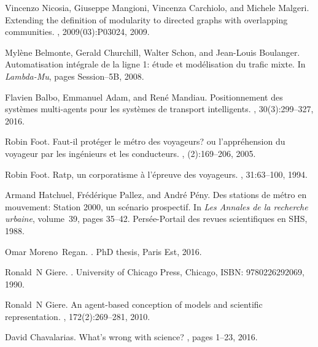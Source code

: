 \documentclass[runningheads,a4paper]{llncs2e/llncs}
\begin{document}
\begin{thebibliography}{10}
Vincenzo Nicosia, Giuseppe Mangioni, Vincenza Carchiolo, and Michele Malgeri.
\newblock Extending the definition of modularity to directed graphs with
  overlapping communities.
,
  2009(03):P03024, 2009.

Myl{\`e}ne Belmonte, Gerald Churchill, Walter Schon, and Jean-Louis Boulanger.
\newblock Automatisation int{\'e}grale de la ligne 1: {\'e}tude et
  mod{\'e}lisation du trafic mixte.
\newblock In {\em Lambda-Mu}, pages Session--5B, 2008.

Flavien Balbo, Emmanuel Adam, and Ren{\'e} Mandiau.
\newblock Positionnement des syst{\`e}mes multi-agents pour les syst{\`e}mes de
  transport intelligents.
, 30(3):299--327, 2016.

Robin Foot.
\newblock Faut-il prot{\'e}ger le m{\'e}tro des voyageurs? ou
  l'appr{\'e}hension du voyageur par les ing{\'e}nieurs et les conducteurs.
, (2):169--206, 2005.

Robin Foot.
\newblock Ratp, un corporatisme {\`a} l'{\'e}preuve des voyageurs.
, 31:63--100, 1994.

Armand Hatchuel, Fr{\'e}d{\'e}rique Pallez, and Andr{\'e} P{\'e}ny.
\newblock Des stations de m{\'e}tro en mouvement: Station 2000, un sc{\'e}nario
  prospectif.
\newblock In {\em Les Annales de la recherche urbaine}, volume~39, pages
  35--42. Pers{\'e}e-Portail des revues scientifiques en SHS, 1988.

Omar Moreno~Regan.
.
\newblock PhD thesis, Paris Est, 2016.

Ronald~N Giere.
.
\newblock University of Chicago Press, Chicago, ISBN: 9780226292069, 1990.

Ronald~N Giere.
\newblock An agent-based conception of models and scientific representation.
, 172(2):269--281, 2010.

David Chavalarias.
\newblock What's wrong with science?
, pages 1--23, 2016.


\end{thebibliography}
\end{document}
